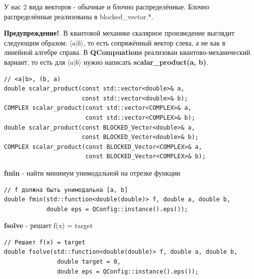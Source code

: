 \documentclass[12pt,fleqn]{article}
\begin{document}
У нас 2 вида векторов - обычные и блочно распределённые. Блочно распределённые реализованы в \textsf{blocked\_vector.*}.

\textbf{Предупреждение!}. В квантовой механике скалярное произведение выглядит следующим образом: $\langle a|b\rangle$, то есть сопряжённый вектор слева, а не как в линейной алгебре справа. 
В \textbf{QCompuations} реализован квантово-механический вариант, то есть для $\langle a|b\rangle$ нужно написать \textbf{scalar\_product(a, b)}.

\begin{mdframed}[linecolor=black, topline=true, bottomline=true,
    leftline=false, rightline=false]
\begin{verbatim}
// <a|b>, (b, a)
double scalar_product(const std::vector<double>& a, 
                      const std::vector<double>& b); 
COMPLEX scalar_product(const std::vector<COMPLEX>& a, 
                       const std::vector<COMPLEX>& b);
double scalar_product(const BLOCKED_Vector<double>& a, 
                      const BLOCKED_Vector<double>& b);
COMPLEX scalar_product(const BLOCKED_Vector<COMPLEX>& a,
                       const BLOCKED_Vector<COMPLEX>& b);
\end{verbatim}
\end{mdframed}

\begin{center}{\textbf{fmin} - найти минимум унимодальной на отрезке функции}\end{center}

\begin{mdframed}[linecolor=black, topline=true, bottomline=true,
    leftline=false, rightline=false]
\begin{verbatim}
// f должна быть унимодальна [a, b]
double fmin(std::function<double(double)> f, double a, double b, 
            double eps = QConfig::instance().eps());
\end{verbatim}
\end{mdframed}

\begin{center}{\textbf{fsolve} - решает f(x) = target}\end{center}

\begin{mdframed}[linecolor=black, topline=true, bottomline=true,
    leftline=false, rightline=false]
\begin{verbatim}
// Решает f(x) = target
double fsolve(std::function<double(double)> f, double a, double b,
               double target = 0, 
               double eps = QConfig::instance().eps());
\end{verbatim}
\end{mdframed}
\end{document}
